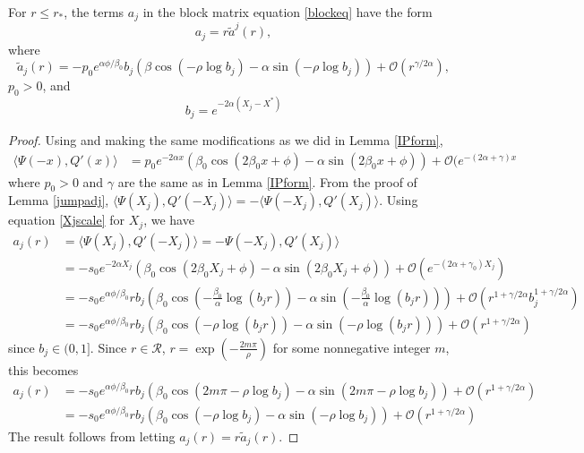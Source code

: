 \documentclass[thesis.tex]{subfiles}
\begin{document}
\begin{lemma}\label{lemma:ajparam}
For $r \leq r_*$, the terms $a_j$ in the block matrix equation \cref{blockeq} have the form
\[
a_j = r \tilde{a}^j(r),
\]
where
\begin{equation}\label{ajparam}
\tilde{a}_j(r) = -p_0 e^{\alpha \phi/\beta_0} b_j \left( \beta \cos\left(-\rho \log b_j \right) - \alpha \sin \left(-\rho \log b_j \right) \right) + \mathcal{O}(r^{\gamma/2\alpha}),
\end{equation}
$p_0 > 0$, and
\begin{equation}\label{bj2}
b_j = e^{-2 \alpha (X_j - X^*)}
\end{equation}

\begin{proof}
Using \cite[Lemma 6.1]{Sandstede1998} and making the same modifications as we did in Lemma \ref{IPform},
\begin{align*}\label{IPpsiQprime}
\langle \Psi(-x), Q'(x) \rangle
&= p_0 e^{-2 \alpha x}\left( \beta_0 \cos(2 \beta_0 x + \phi) - \alpha \sin(2 \beta_0 x + \phi)\right) + \mathcal{O}(e^{-(2 \alpha + \gamma) x}
\end{align*}
where $p_0 > 0$ and $\gamma$ are the same as in Lemma \ref{IPform}. From the proof of Lemma \ref{jumpadj}, $\langle \Psi(X_j), Q'(-X_j) \rangle = - \langle \Psi(-X_j), Q'(X_j) \rangle$. Using equation \cref{Xjscale} for $X_j$, we have
\begin{align*}
a_j(r) &= \langle \Psi(X_j), Q'(-X_j) \rangle = -\Psi(-X_j), Q'(X_j) \rangle \\
&= -s_0 e^{-2 \alpha X_j}\left( \beta_0 \cos(2 \beta_0 X_j + \phi) - \alpha \sin(2 \beta_0 X_j + \phi)\right) + \mathcal{O}(e^{-(2 \alpha + \gamma_0) X_j}) \\
&= -s_0 e^{\alpha \phi/\beta_0} r b_j \left( \beta_0 \cos\left( -\frac{\beta_0}{\alpha} \log(b_j r) \right) - \alpha \sin \left( -\frac{\beta_0}{\alpha} \log(b_j r) \right) \right) + \mathcal{O}(r^{1+\gamma/2\alpha} b_j^{1 + \gamma/2\alpha}) \\
&= -s_0 e^{\alpha \phi/\beta_0} r b_j \left( \beta_0 \cos\left( -\rho \log(b_j r) \right) - \alpha \sin \left( -\rho \log(b_j r) \right) \right) + \mathcal{O}(r^{1+\gamma/2\alpha})
\end{align*}
since $b_j \in (0, 1]$. Since $r \in \mathcal{R}$, $r = \exp\left(-\frac{2 m \pi}{\rho}\right)$ for some nonnegative integer $m$, this becomes 
\begin{align*}
a_j(r) &= -s_0 e^{\alpha \phi/\beta_0} r b_j \left( \beta_0 \cos\left( 2 m \pi -\rho \log b_j \right) - \alpha \sin \left( 2 m \pi -\rho \log b_j \right) \right) + \mathcal{O}(r^{1+\gamma/2\alpha}) \\
&= -s_0 e^{\alpha \phi/\beta_0} r b_j \left( \beta_0 \cos\left(-\rho \log b_j \right) - \alpha \sin \left(-\rho \log b_j \right) \right) + \mathcal{O}(r^{1+\gamma/2\alpha})
\end{align*}
The result follows from letting $a_j(r) = r \tilde{a}_j(r)$.
\end{proof}
\end{lemma}
\end{document}
